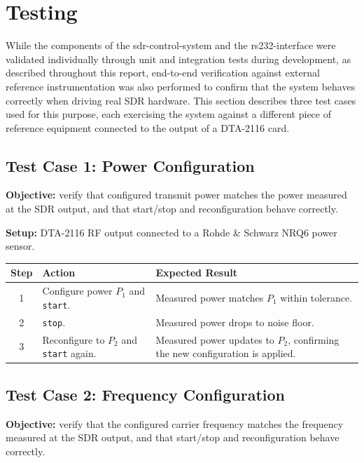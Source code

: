 \section{Testing}
\label{sec:testing}

While the components of the \gls{sdr-control-system} and the
\gls{rs232-interface} were validated individually through unit and
integration tests during development, as described throughout this
report, end-to-end verification against external reference
instrumentation was also performed to confirm that the system behaves
correctly when driving real \gls{SDR} hardware. This section describes
three test cases used for this purpose, each exercising the system
against a different piece of reference equipment connected to the
output of a DTA-2116 card.

\subsection{Test Case 1: Power Configuration}
\label{sec:tc1-power}

\textbf{Objective:} verify that configured transmit power matches the
power measured at the \gls{SDR} output, and that start/stop and
reconfiguration behave correctly.

\textbf{Setup:} DTA-2116 \gls{RF} output connected to a Rohde \&
Schwarz NRQ6 power sensor.

\begin{center}
\small
\begin{tabular}{|c|p{5.5cm}|p{4.0cm}|}
\hline
\textbf{Step} & \textbf{Action} & \textbf{Expected Result} \\
\hline
1 & Configure power $P_1$ and \texttt{start}. & Measured power
matches $P_1$ within tolerance. \\
\hline
2 & \texttt{stop}. & Measured power drops to noise floor. \\
\hline
3 & Reconfigure to $P_2$ and \texttt{start} again. & Measured power
updates to $P_2$, confirming the new configuration is applied. \\
\hline
\end{tabular}
\end{center}

\subsection{Test Case 2: Frequency Configuration}
\label{sec:tc2-frequency}

\textbf{Objective:} verify that the configured carrier frequency
matches the frequency measured at the \gls{SDR} output, and that
start/stop and reconfiguration behave correctly.

